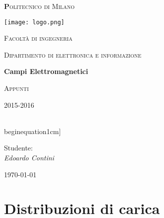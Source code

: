 \documentclass[10pt,a4paper]{report}
\begin{document}
\begin{titlepage}

	\centering
	{\scshape\huge\textbf Politecnico di Milano \par}
	\vspace{0.5cm}

	\texttt{[image: logo.png]}\par\vspace{0.2cm}
	
	{\scshape\small Facoltà di ingegneria\par}
	{\scshape\small Dipartimento di elettronica e informazione\par}
	\vspace{1.5cm}
	{\huge\bfseries Campi Elettromagnetici\par}
	\vspace{1.5cm}
	{\scshape Appunti\par}
	{\scshape\small 2015-2016 \par}
	\vspace{2cm}
	\vfill
    \\begin{equation}1cm]
	
	\raggedright
    {Studente:\\ \textit{Edoardo Contini}
	
	}\vfill
	\raggedleft
	{\large \today\par}
	
	\end{titlepage}


        \newpage
        \null 
        \thispagestyle{empty} 
        \newpage     
\setcounter{page}{0}
\tableofcontents
		\newpage
        \null 
        \thispagestyle{empty} 
        \newpage


\chapter{Distribuzioni di carica}
\end{document}
